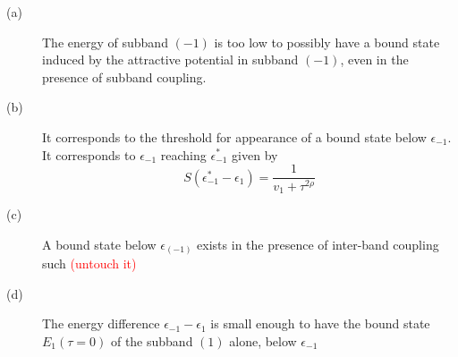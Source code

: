 \documentclass[11pt]{article} %
\newcommand{\ns}[1]{\textcolor{red}{#1}}
\begin{document}
\begin{description}
 \item[(a)] The energy of subband $(-1)$ is too low to possibly have a bound state induced by the attractive potential in subband $(-1)$, even in the presence of subband coupling.
 \item[(b)] It corresponds  to the threshold for appearance of a bound state below $\epsilon_{{-1}}$.  It corresponds to $\epsilon_{-1}$ reaching $\epsilon_{-1}^{*}$ given by 
 \begin{equation}
 S(\epsilon^{*}_{-1}-\epsilon_{1})=\frac{1}{v_{1}+\tau^{2\rho}}
 \end{equation}
 \item[(c)] A bound state below $\epsilon_{(-1)}$ exists in the presence of inter-band coupling such \ns{(untouch it)}
 \item[(d)] The energy difference $\epsilon_{-1}-\epsilon_{1}$ is small enough to have the bound state $E_{1}(\tau=0)$ of the subband $(1)$ alone, below $\epsilon_{-1}$

\end{description}

\subsubsection{}









\end{document}
